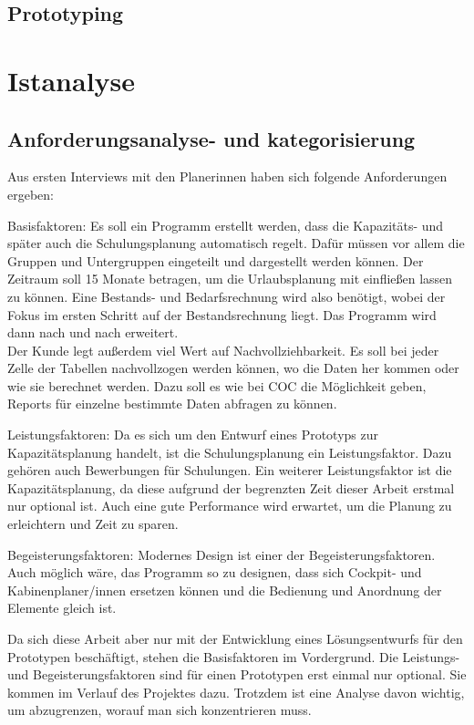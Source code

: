 \documentclass [12pt, a4paper, oneside, titlepage, ngerman]{article}
\begin{document}
\subsection{Prototyping}
\newpage

\section {Istanalyse}
\subsection{Anforderungsanalyse- und kategorisierung}
Aus ersten Interviews mit den Planerinnen haben sich folgende Anforderungen ergeben:
\begin{description}
\item Basisfaktoren: Es soll ein Programm erstellt werden, dass die Kapazitäts- und später auch die Schulungsplanung automatisch regelt. Dafür müssen vor allem die Gruppen und Untergruppen eingeteilt und dargestellt werden können. Der Zeitraum soll 15 Monate betragen, um die Urlaubsplanung mit einfließen lassen zu können. Eine Bestands- und Bedarfsrechnung wird also benötigt, wobei der Fokus im ersten Schritt auf der Bestandsrechnung liegt. Das Programm wird dann nach und nach erweitert. \\
Der Kunde legt außerdem viel Wert auf Nachvollziehbarkeit. Es soll bei jeder Zelle der Tabellen nachvollzogen werden können, wo die Daten her kommen oder wie sie berechnet werden. Dazu soll es wie bei \ac{COC} die Möglichkeit geben, Reports für einzelne bestimmte Daten abfragen zu können.
\item Leistungsfaktoren: Da es sich um den Entwurf eines Prototyps zur Kapazitätsplanung handelt, ist die Schulungsplanung ein Leistungsfaktor. Dazu gehören auch Bewerbungen für Schulungen. Ein weiterer Leistungsfaktor ist die Kapazitätsplanung, da diese aufgrund der begrenzten Zeit dieser Arbeit erstmal nur optional ist. Auch eine gute Performance wird erwartet, um die Planung zu erleichtern und Zeit zu sparen.
\item Begeisterungsfaktoren: Modernes Design ist einer der Begeisterungsfaktoren. Auch möglich wäre, das Programm so zu designen, dass sich Cockpit- und Kabinenplaner/innen ersetzen können und die Bedienung und Anordnung der Elemente gleich ist. 
\end{description}
Da sich diese Arbeit aber nur mit der Entwicklung eines Lösungsentwurfs für den Prototypen beschäftigt, stehen die Basisfaktoren im Vordergrund. Die Leistungs- und Begeisterungsfaktoren sind für einen Prototypen erst einmal nur optional. Sie kommen im Verlauf des Projektes dazu. Trotzdem ist eine Analyse davon wichtig, um abzugrenzen, worauf man sich konzentrieren muss.
\end{document}
